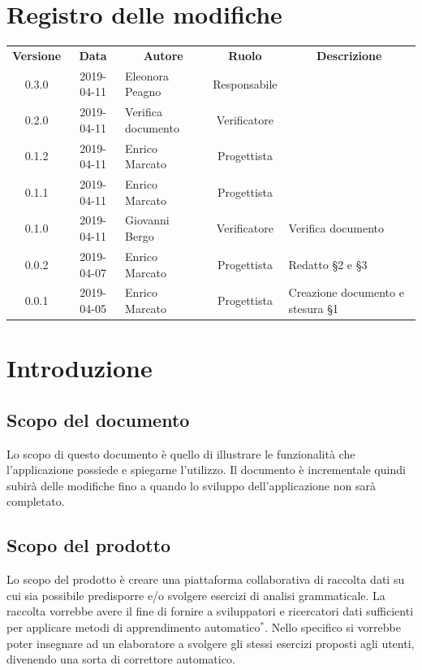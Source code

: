 \documentclass[11pt,a4paper]{article}
\begin{document}
	
	
	{\def\arraystretch{2}\tabcolsep=10pt
	\newpage
	\section*{\centering Registro delle modifiche}
	\begin{tabularx}{\textwidth}{ c | c | p{3.80cm} | c | X }
		\rowcolor{LightBlue}
		\color{white}\bfseries Versione & \color{white}\bfseries Data & \multicolumn{1}{c}{\color{white}\bfseries Autore}
		& \color{white}\bfseries Ruolo & \multicolumn{1}{c}{\color{white}\bfseries Descrizione}\\[0.25cm]
		0.3.0 & 2019-04-11 & Eleonora Peagno & Responsabile &  \\ \hline
		0.2.0 & 2019-04-11 & Verifica documento & Verificatore &  \\ \hline
		0.1.2 & 2019-04-11 & Enrico Marcato & Progettista &  \\ \hline
		0.1.1 & 2019-04-11 & Enrico Marcato & Progettista &  \\ \hline
		0.1.0 & 2019-04-11 & Giovanni Bergo & Verificatore & Verifica documento \\ \hline
		0.0.2 & 2019-04-07 & Enrico Marcato & Progettista & Redatto \S2 e \S3 \\ \hline
		0.0.1 & 2019-04-05 & Enrico Marcato & Progettista & Creazione documento e stesura \S1 \\ 
	 \hline		
	\end{tabularx}
	
	\newpage	
	
	\renewcommand  \contentsname {\Large Indice} 
	
	\tableofcontents
	\newpage
	\listoffigures

	\newpage
	
	\section{Introduzione}
	\subsection{Scopo del documento}
	Lo scopo di questo documento è quello di illustrare le funzionalità che l'applicazione possiede e spiegarne l'utilizzo. Il documento è incrementale quindi subirà delle modifiche fino a quando lo sviluppo dell'applicazione non sarà completato.
	\subsection{Scopo del prodotto}
	Lo scopo del prodotto è creare una piattaforma collaborativa di raccolta dati su cui sia possibile predisporre e/o svolgere esercizi di analisi grammaticale. La raccolta vorrebbe avere il fine di fornire a sviluppatori e ricercatori dati sufficienti per applicare metodi di apprendimento automatico$^*$. Nello specifico si vorrebbe poter insegnare ad un elaboratore a svolgere gli stessi esercizi proposti agli utenti, divenendo una sorta di correttore automatico.
	
}
\end{document}
